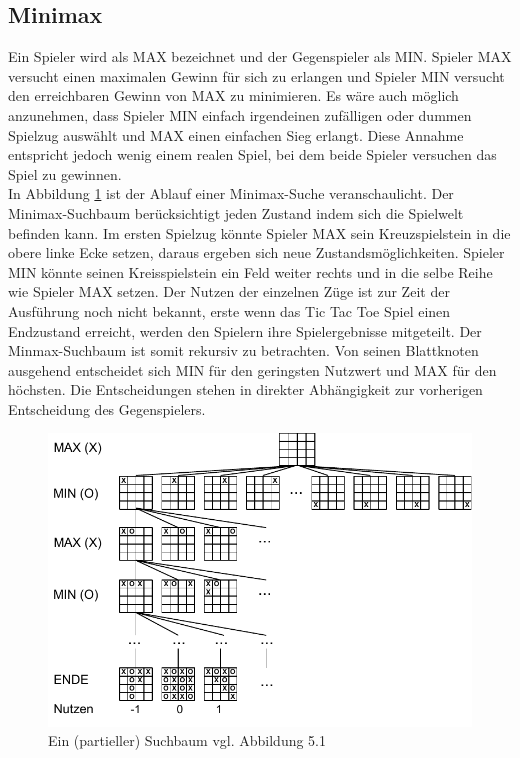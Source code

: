 \subsection{Minimax}
\label{subsec:Minimax}
Ein Spieler wird als MAX bezeichnet und der Gegenspieler als MIN. Spieler MAX versucht einen maximalen Gewinn für sich zu erlangen und Spieler MIN versucht den erreichbaren Gewinn von MAX zu minimieren. Es wäre auch möglich anzunehmen, dass Spieler MIN einfach irgendeinen zufälligen oder dummen Spielzug auswählt und MAX einen einfachen Sieg erlangt. Diese Annahme entspricht jedoch wenig einem realen Spiel, bei dem beide Spieler versuchen das Spiel zu gewinnen.\\

In Abbildung \ref{fig:minimax_tictactoe} ist der Ablauf einer Minimax-Suche veranschaulicht. Der Minimax-Suchbaum berücksichtigt jeden Zustand indem sich die Spielwelt befinden kann. Im ersten Spielzug könnte Spieler MAX sein Kreuzspielstein in die obere linke Ecke setzen, daraus ergeben sich neue Zustandsmöglichkeiten. Spieler MIN könnte seinen Kreisspielstein ein Feld weiter rechts und in die selbe Reihe wie Spieler MAX setzen. Der Nutzen der einzelnen Züge ist zur Zeit der Ausführung noch nicht bekannt, erste wenn das Tic Tac Toe Spiel einen Endzustand erreicht, werden den Spielern ihre Spielergebnisse mitgeteilt. Der Minmax-Suchbaum ist somit rekursiv zu betrachten. Von seinen Blattknoten ausgehend entscheidet sich MIN für den geringsten Nutzwert und MAX für den höchsten. Die Entscheidungen stehen in direkter Abhängigkeit zur vorherigen Entscheidung des Gegenspielers. \\
  
\begin{figure}[!htbp]
  \centering
  \includegraphics{inhalt/abbildungen/minimax_tictactoe.pdf}
  \caption{Ein (partieller) Suchbaum vgl. Abbildung 5.1 \cite[208]{Russell}}
  \label{fig:minimax_tictactoe}
\end{figure} 

